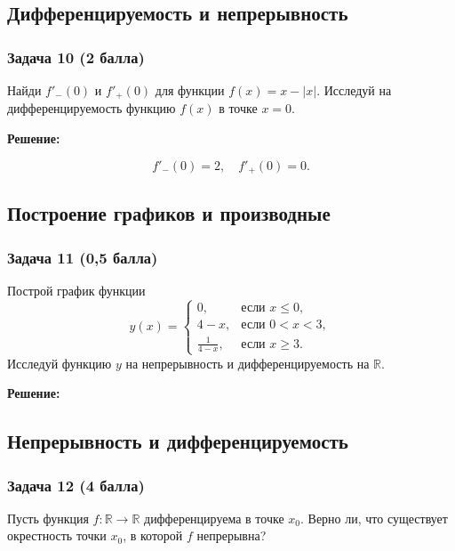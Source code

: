 \documentclass[a4paper,12pt]{article}
\begin{document}
\vspace{1cm}

\subsection{Дифференцируемость и непрерывность}

\subsubsection{Задача 10 (2 балла)}
Найди \( f'_-(0) \) и \( f'_+(0) \) для функции \( f(x) = x - |x| \). Исследуй на дифференцируемость функцию \( f(x) \) в точке \( x = 0 \).

\textbf{Решение:}

\[
f'_-(0) = 2, \quad f'_+(0) = 0.
\]
\vspace{1cm}

\subsection{Построение графиков и производные}

\subsubsection{Задача 11 (0,5 балла)}
Построй график функции
\[
y(x) =
\begin{cases}
0, & \text{если } x \leq 0, \\
4 - x, & \text{если } 0 < x < 3, \\
\frac{1}{4 - x}, & \text{если } x \geq 3.
\end{cases}
\]
Исследуй функцию \( y \) на непрерывность и дифференцируемость на \( \mathbb{R} \).

\textbf{Решение:}


\vspace{1cm}

\subsection{Непрерывность и дифференцируемость}

\subsubsection{Задача 12 (4 балла)}
Пусть функция \( f : \mathbb{R} \to \mathbb{R} \) дифференцируема в точке \( x_0 \). Верно ли, что существует окрестность точки \( x_0 \), в которой \( f \) непрерывна?
\end{document}
